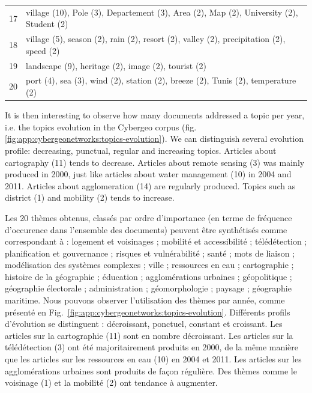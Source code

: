 {\begin{table}
\begin{tabular}{c|p{65mm}}
  17 & village (10), Pole (3), Departement (3), Area (2), Map (2), University (2), Student (2) \\
  18 & village (5), season (2), rain (2), resort (2), valley (2), precipitation (2), speed (2) \\
  19 & landscape (9), heritage (2), image (2), tourist (2) \\
  20 & port (4), sea (3), wind (2), station (2), breeze (2), Tunis (2), temperature (2) \\
\end{tabular}
\end{table}
It is then interesting to observe how many documents addressed a topic per year, i.e. the topics evolution in the Cybergeo corpus (fig. \ref{fig:app:cybergeonetworks:topics-evolution}). We can distinguish several evolution profile: decreasing, punctual, regular and increasing topics. Articles about cartography (11) tends to decrease. Articles about remote sensing (3) was mainly produced in 2000, just like articles about water management (10) in 2004 and 2011. Articles about agglomeration (14) are regularly produced. Topics such as district (1) and mobility (2) tends to increase.
}{
Les 20 thèmes obtenus, classés par ordre d'importance (en terme de fréquence d'occurence dans l'ensemble des documents) peuvent être synthétisés comme correspondant à : logement et voisinages ; mobilité et accessibilité ; télédétection ; planification et gouvernance ; risques et vulnérabilité ; santé ; mots de liaison ; modélisation des systèmes complexes ; ville ; ressources en eau ; cartographie ; histoire de la géographie ; éducation ; agglomérations urbaines ; géopolitique ; géographie électorale ; administration ; géomorphologie ; paysage ; géographie maritime. Nous pouvons observer l'utilisation des thèmes par année, comme présenté en Fig.~\ref{fig:app:cybergeonetworks:topics-evolution}. Différents profils d'évolution se distinguent : décroissant, ponctuel, constant et croissant. Les articles sur la cartographie (11) sont en nombre décroissant. Les articles sur la télédétection (3) ont été majoritairement produits en 2000, de la même manière que les articles sur les ressources en eau (10) en 2004 et 2011. Les articles sur les agglomérations urbaines sont produits de façon régulière. Des thèmes comme le voisinage (1) et la mobilité (2) ont tendance à augmenter.
}



